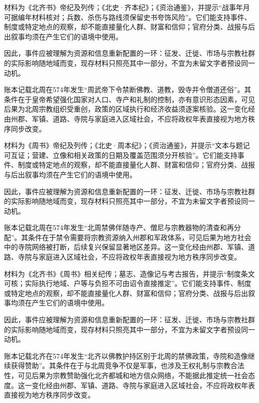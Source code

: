 材料为《北齐书》帝纪及列传；《北史·齐本纪》；《资治通鉴》，并提示“战事年月可据编年材料核对；兵数、杀伤与路线须保留史书夸饰风险”。它们能支持事件、制度或特定地点的观察，却不能直接量化人群、财富和信仰；官府分类、战报与后出叙事均须在产生它们的语境中使用。

因此，事件应被理解为资源和信息重新配置的一环：征发、迁徙、市场与宗教社群的实际影响随地域而变，现存材料只照亮其中一部分，不宜为未留文字者预设同一动机。

账本记载北周在574年发生“周武帝下令禁断佛教、道教，毁寺并令僧道还俗”。其条件在于皇帝希望强化国家对人口、寺产和礼制的控制，亦有意识形态因素，可见后果为北周宗教组织受重创，政策的区域执行和经济收益须逐案核验。这一变化经由州郡、军镇、道路、寺院与家庭进入区域社会，不应将政权年表直接视为地方秩序同步改变。

材料为《周书》帝纪及列传；《北史·周本纪》；《资治通鉴》，并提示“文本与题记可互证；营建、立像和相关政策的日期及覆盖范围须分开核验”。它们能支持事件、制度或特定地点的观察，却不能直接量化人群、财富和信仰；官府分类、战报与后出叙事均须在产生它们的语境中使用。

因此，事件应被理解为资源和信息重新配置的一环：征发、迁徙、市场与宗教社群的实际影响随地域而变，现存材料只照亮其中一部分，不宜为未留文字者预设同一动机。

账本记载北周在574年发生“北周禁佛伴随寺产、僧尼与宗教器物的清查和再分配”。其条件在于禁令需要将宗教资源纳入州郡和军政体系，可见后果为地方社会中的寺院网络被打断，后续复兴保留显著地区差异。这一变化经由州郡、军镇、道路、寺院与家庭进入区域社会，不应将政权年表直接视为地方秩序同步改变。

材料为《北齐书》《周书》相关纪传；墓志、造像记与考古报告，并提示“制度条文可核；实际执行地域、户等与负担不可由诏令直接推定”。它们能支持事件、制度或特定地点的观察，却不能直接量化人群、财富和信仰；官府分类、战报与后出叙事均须在产生它们的语境中使用。

因此，事件应被理解为资源和信息重新配置的一环：征发、迁徙、市场与宗教社群的实际影响随地域而变，现存材料只照亮其中一部分，不宜为未留文字者预设同一动机。

账本记载北齐在574年发生“北齐以佛教护持区别于北周的禁佛政策，寺院和造像继续获得赞助”。其条件在于与北周竞争不仅是军事，也涉及王权礼制与宗教合法性，可见后果为宗教赞助强化北齐都城和地方信众网络，不能据此推定统一社会态度。这一变化经由州郡、军镇、道路、寺院与家庭进入区域社会，不应将政权年表直接视为地方秩序同步改变。


